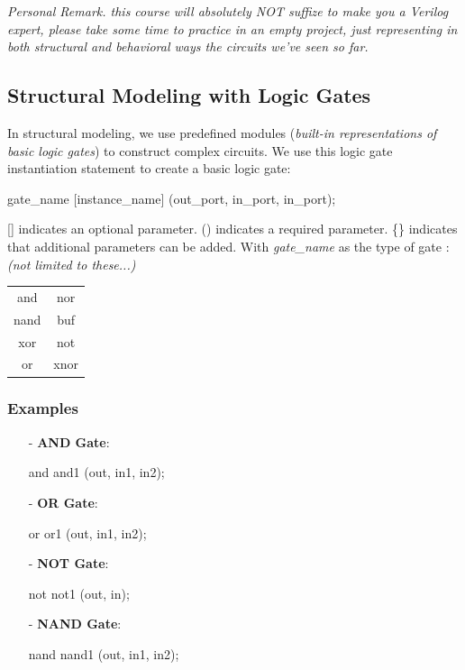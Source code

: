 \documentclass[12pt,openany]{book}
\begin{document}
					\textit{Personal Remark. this course will absolutely NOT suffize to make you a Verilog expert, please take some time to practice in an empty project, just representing in both structural and behavioral ways the circuits we've seen so far. }
			      	\subsection{Structural Modeling with Logic Gates}
			      	In structural modeling, we use predefined modules (\textit{built-in representations of basic logic gates}) to construct complex circuits.\newline
			      	\vspace{5px}
			      	We use this logic gate instantiation statement to create a basic logic gate:
\begin{vhdl}
gate_name [instance_name] (out_port, in_port{, in_port});
\end{vhdl}
			      	[] indicates an optional parameter.\newline
			      	()  indicates a required parameter. \newline
			      	\{\} indicates that additional parameters can be added. \newline
			      	\vspace*{10px}
			      	With \textit{gate\_name} as the type of gate :\newline
			      	\textit{(not limited to these...)}
			      	\begin{center}
			      		\begin{tabular}{|c|c|}
			      			\hline
			      			and  & nor  \\
			      			nand & buf  \\
			      			xor  & not  \\
			      			or   & xnor \\
			      			\hline
			      		\end{tabular}
			      	\end{center}
			      	
			      	\subsubsection{Examples}
			      	
			      	\begin{itemize}
\item[-] \textbf{AND Gate}:
    \begin{vhdl}
    and and1 (out, in1, in2);
    \end{vhdl}
\item[-] \textbf{OR Gate}:
    \begin{vhdl}
    or or1 (out, in1, in2);
    \end{vhdl}
\item[-] \textbf{NOT Gate}:
    \begin{vhdl}
    not not1 (out, in);
    \end{vhdl}
\item[-] \textbf{NAND Gate}:
    \begin{vhdl}
    nand nand1 (out, in1, in2);
    \end{vhdl}
			      	\end{itemize}
			      	\newpage
\end{document}
